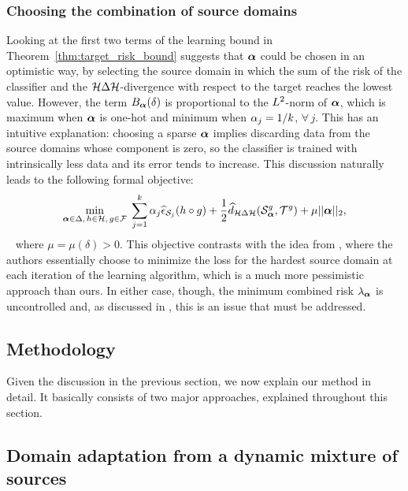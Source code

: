 \subsubsection{Choosing the combination of source domains}
\label{sec:modafm_choose_alpha}
Looking at the first two terms of the learning bound in Theorem~\ref{thm:target_risk_bound} suggests that ${\bm{\alpha}}$ could be chosen in an optimistic way, by selecting the source domain in which the sum of the risk of the classifier and the ${\mathcal{H}} \Delta {\mathcal{H}}$-divergence with respect to the target reaches the lowest value. However, the term $B_{\bm{\alpha}}(\delta)$ is proportional to the $L^2$-norm of ${\bm{\alpha}}$, which is maximum when ${\bm{\alpha}}$ is one-hot and minimum when ${\alpha}_j = 1/k$, $\forall\, j$. This has an intuitive explanation: choosing a sparse ${\bm{\alpha}}$ implies discarding data from the source domains whose component is zero, so the classifier is trained with intrinsically less data and its error tends to increase. This discussion naturally leads to the following formal objective:
\begin{equation}
\label{eq:formal_obj}
\min_{{\bm{\alpha}} \in \Delta, \, h\in {\mathcal{H}}, \, g \in {\mathcal{F}}}\; \sum_{j=1}^k \alpha_j\widehat{\epsilon}_{{\mathcal{S}}_j}(h \circ g) + \frac{1}{2} \widehat{d}_{{\mathcal{H}} \Delta {\mathcal{H}}}({\mathcal{S}}_{\bm{\alpha}}^g, {\mathcal{T}}^g) + \mu ||{\bm{\alpha}}||_2,
\end{equation}~
where $\mu = \mu(\delta) > 0$. This objective contrasts with the idea from \citet{Zhao2018}, where the authors essentially choose to minimize the loss for the hardest source domain at each iteration of the learning algorithm, which is a much more pessimistic approach than ours. In either case, though, the minimum combined risk $\lambda_{\bm{\alpha}}$ is uncontrolled and, as discussed in , this is an issue that must be addressed.

\subsection{Methodology}
\label{sec:modafm_method}

Given the discussion in the previous section, we now explain our method in detail. It basically consists of two major approaches, explained throughout this section.

\subsection{Domain adaptation from a dynamic mixture of sources}

